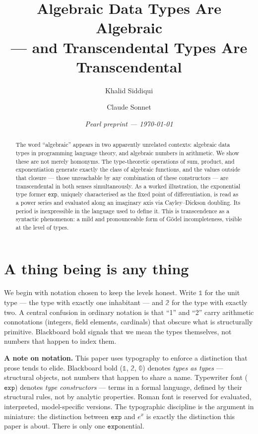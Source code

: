 \documentclass[11pt, a4paper]{article}
\theoremstyle{pearlstyle}
\newcommand{\bone}{\mathbb{1}}
\newcommand{\btwo}{\mathbb{2}}
\newcommand{\bzero}{\mathbb{0}}
\newcommand{\Exp}{\mathtt{exp}}
\begin{document}
\title{Algebraic Data Types Are Algebraic\\[4pt]
  {\large --- and Transcendental Types Are Transcendental}}
\author{Khalid Siddiqui \and Claude Sonnet}
\date{\itshape Pearl preprint --- \today}
\maketitle

\begin{abstract}
The word ``algebraic'' appears in two apparently unrelated contexts:
algebraic data types in programming language theory, and algebraic numbers in
arithmetic. We show these are not merely homonyms. The type-theoretic operations
of sum, product, and exponentiation generate exactly the class of algebraic
functions, and the values outside that closure --- those unreachable by any
combination of these constructors --- are transcendental in both senses
simultaneously. As a worked illustration, the exponential type former
$\mathtt{exp}$, uniquely characterised as the fixed point of differentiation,
is read as a power series and evaluated along an imaginary axis via
Cayley--Dickson doubling. Its period is inexpressible in the language used to
define it. This is transcendence as a syntactic phenomenon: a mild and
pronounceable form of G\"{o}del incompleteness, visible at the level of types.
\end{abstract}

\section{A thing being is any thing}

We begin with notation chosen to keep the levels honest. Write $\bone$ for the
unit type --- the type with exactly one inhabitant --- and $\btwo$ for the type
with exactly two. A central confusion in ordinary notation is that ``1'' and
``2'' carry arithmetic connotations (integers, field elements, cardinals) that
obscure what is structurally primitive. Blackboard bold signals that we mean the
types themselves, not numbers that happen to index them.

\medskip
\noindent\textbf{A note on notation.} This paper uses typography to enforce a
distinction that prose tends to elide. Blackboard bold ($\bone$, $\btwo$,
$\bzero$) denotes \emph{types as types} --- structural objects, not numbers that
happen to share a name. Typewriter font ($\Exp$) denotes \emph{type
constructors} --- terms in a formal language, defined by their structural rules,
not by analytic properties. Roman font is reserved for evaluated,
interpreted, model-specific versions. The typographic discipline is the argument
in miniature: the distinction between $\Exp$ and $e^x$ is exactly the
distinction this paper is about. There is only one $\mathtt{exp}$onential.
\end{document}
